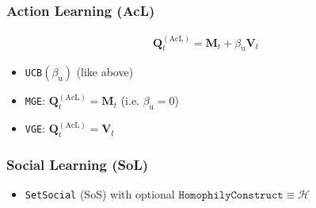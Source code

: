 \documentclass[fleqn]{article}
\begin{document}
\subsubsection*{Action Learning (AcL)}

\begin{align*}
    \mathbf{Q}^{\mathrm{(AcL)}}_t =
        \mathbf{M}_t +
        \beta_{\mathrm{u}} \mathbf{V}_t
\end{align*}

\begin{itemize}
    \item \texttt{UCB}$\left(\beta_{\mathrm{u}}\right)$ (like above)
    \item \texttt{MGE}: $\mathbf{Q}^{\mathrm{(AcL)}}_t = \mathbf{M}_t$ (i.e. $\beta_{\mathrm{u}} = 0$)
    \item \texttt{VGE}: $\mathbf{Q}^{\mathrm{(AcL)}}_t = \mathbf{V}_t$
\end{itemize}

\subsubsection*{Social Learning (SoL)}

\begin{itemize}
    \item \texttt{SetSocial} (SoS)
        with optional $\texttt{HomophilyConstruct} \equiv \mathcal{H}$
\end{itemize}
\end{document}
